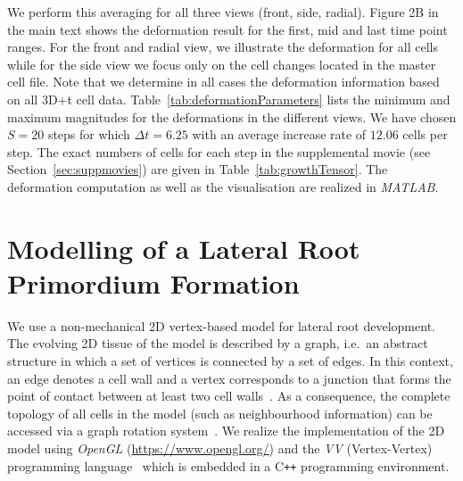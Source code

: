 \documentclass[11pt,a4paper, final]{article}
\begin{document}
We perform this averaging for all three views (front, side, radial). Figure 2B in the main text shows the deformation result for the first, mid and last time point ranges. For the front and radial view, we illustrate the deformation for all cells while for the side view we focus only on the cell changes located in the master cell file. Note that we determine in all cases the deformation information based on all 3D+t cell data. Table~\ref{tab:deformationParameters} lists the minimum and maximum magnitudes for the deformations in the different views. We have chosen $S=20$ steps for which $\Delta t = 6.25$ with an average increase rate of $12.06$ cells per step. The exact numbers of cells for each step in the supplemental movie (see Section~\ref{sec:suppmovies}) are given in Table~\ref{tab:growthTensor}. The deformation computation as well as the visualisation are realized in \textit{MATLAB}.

\clearpage
\section{Modelling of a Lateral Root Primordium Formation}
\noindent
We use a non-mechanical 2D vertex-based model for lateral root development. The evolving 2D tissue of the model is described by a graph, i.e.~an abstract structure in which a set of vertices is connected by a set of edges. In this context, an edge denotes a cell wall and a vertex corresponds to a junction that forms the point of contact between at least two cell walls~\cite{prusinkiewicz_lindenmayer_1990, prusinkiewicz_runions_2012}. As a consequence, the complete topology of all cells in the model (such as neighbourhood information) can be accessed via a graph rotation system~\cite{edmonds_1960}. We realize the implementation of the 2D model using \textit{OpenGL} (\href{https://www.opengl.org/}{https://www.opengl.org/}) and the \textit{VV} (Vertex-Vertex) programming language~\cite{smith_et_al_2004, smith_2006} which is embedded in a C{}\verb!++! programming environment.

\end{document}
